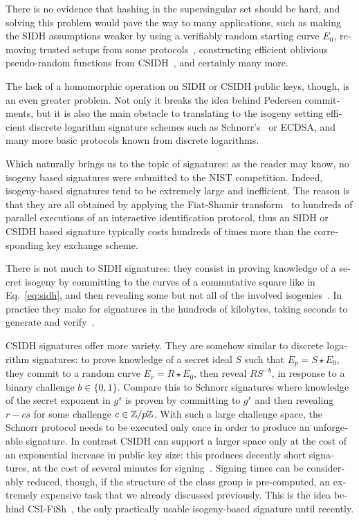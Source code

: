 \begin{otherlanguage}{english}
There is no evidence that hashing in the supersingular set should be
hard, and solving this problem would pave the way to many
applications, such as making the SIDH assumptions weaker by using a
verifiably random starting curve $E_0$, removing trusted setups from
some protocols~\cite{AC:DMPS19,EPRINT:BurDeF20}, constructing
efficient oblivious pseudo-random functions from
CSIDH~\cite{jarecki2016highly}, and certainly many more.

The lack of a homomorphic operation on SIDH or CSIDH public keys,
though, is an even greater problem. Not only it breaks the idea behind
Pedersen commitments, but it is also the main obstacle to translating
to the isogeny setting efficient discrete logarithm signature schemes
such as Schnorr's~\cite{C:Schnorr89} or ECDSA, and many more basic
protocols known from discrete logarithms.

Which naturally brings us to the topic of signatures: as the reader
may know, no isogeny based signatures were submitted to the NIST
competition. Indeed, isogeny-based signatures tend to be extremely
large and inefficient. The reason is that they are all obtained by
applying the Fiat-Shamir transform~\cite{C:FiaSha86} to hundreds of
parallel executions of an interactive identification protocol, thus an
SIDH or CSIDH based signature typically costs hundreds of times more
than the corresponding key exchange scheme.

There is not much to SIDH signatures: they consist in proving
knowledge of a secret isogeny by committing to the curves of a
commutative square like in Eq.~\eqref{eq:sidh}, and then revealing
some but not all of the involved isogenies~\cite{defeo+jao+plut12}.
In practice they make for signatures in the hundreds of kilobytes,
taking seconds to generate and verify~\cite{FC:YAJJS17}.

CSIDH signatures offer more variety. They are somehow similar to
discrete logarithm signatures: to prove knowledge of a secret ideal
$S$ such that $E_p=S\star E_0$, they commit to a random curve
$E_r=R\star E_0$, then reveal $RS^{-b}$, in response to a binary
challenge $b\in\{0,1\}$. Compare this to Schnorr signatures where
knowledge of the secret exponent in $g^s$ is proven by committing to
$g^r$ and then revealing $r-cs$ for some challenge $c\in\mathbb{Z}/p\mathbb{Z}$. With
such a large challenge space, the Schnorr protocol needs to be
executed only once in order to produce an unforgeable signature. In
contrast CSIDH can support a larger space only at the cost of an
exponential increase in public key size: this produces decently short
signatures, at the cost of several minutes for
signing~\cite{EC:DeFGal19}. Signing times can be considerably reduced,
though, if the structure of the class group is pre-computed, an
extremely expensive task that we already discussed previously. This is
the idea behind CSI-FiSh~\cite{10.1007/978-3-030-34578-5_9}, the only
practically usable isogeny-based signature until recently.


\end{otherlanguage}
